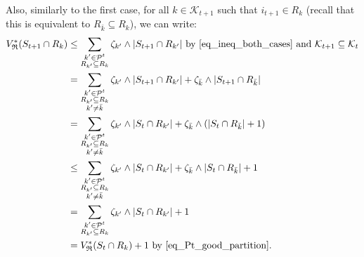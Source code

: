 \documentclass[
  11pt,
  a4paper,
]{article}
\theoremstyle{plain}
\theoremstyle{plain}
\theoremstyle{definition}
\theoremstyle{plain}
\theoremstyle{definition}
\theoremstyle{remark}
\begin{document}
Also, similarly to the first case, for all \(k\in\mathcal{K}_{t+1}\)
such that \(i_{t+1}\in R_k\) (recall that this is equivalent to
\(R_{\bar k}\subseteq R_k\)), we can write: \begin{align}
V^*_{\mathfrak{R}}(S_{t+1}\cap R_k)&\leq \sum_{\substack{k'\in\mathcal{P}^{t}\\R_{k'}\subseteq R_k}} \zeta_{k'}\wedge |S_{t+1}\cap R_{k'}| \text{ by \eqref{eq_ineq_both_cases} and }\mathcal{K}_{t+1}\subseteq\mathcal{K}_t\notag\\
&=\sum_{\substack{k'\in\mathcal{P}^{t}\\R_{k'}\subseteq R_k\\ k'\neq\bar k}} \zeta_{k'}\wedge |S_{t+1}\cap R_{k'}| + \zeta_{\bar k}\wedge |S_{t+1}\cap R_{\bar k}| \notag\\
&=\sum_{\substack{k'\in\mathcal{P}^{t}\\R_{k'}\subseteq R_k\\ k'\neq\bar k}} \zeta_{k'}\wedge |S_{t}\cap R_{k'}| + \zeta_{\bar k}\wedge( |S_{t}\cap R_{\bar k}| +1)\notag\\
&\leq \sum_{\substack{k'\in\mathcal{P}^{t}\\R_{k'}\subseteq R_k\\ k'\neq\bar k}} \zeta_{k'}\wedge |S_{t}\cap R_{k'}| + \zeta_{\bar k}\wedge|S_{t}\cap R_{\bar k}| +1\notag\\
&=\sum_{\substack{k'\in\mathcal{P}^{t}\\R_{k'}\subseteq R_k}} \zeta_{k'}\wedge |S_{t}\cap R_{k'}|  + 1\notag\\
&=V^*_{\mathfrak{R}}(S_t\cap R_k) +1  \text{ by \eqref{eq_Pt_good_partition}}.\label{eq_ineq_}
\end{align}
\end{document}
